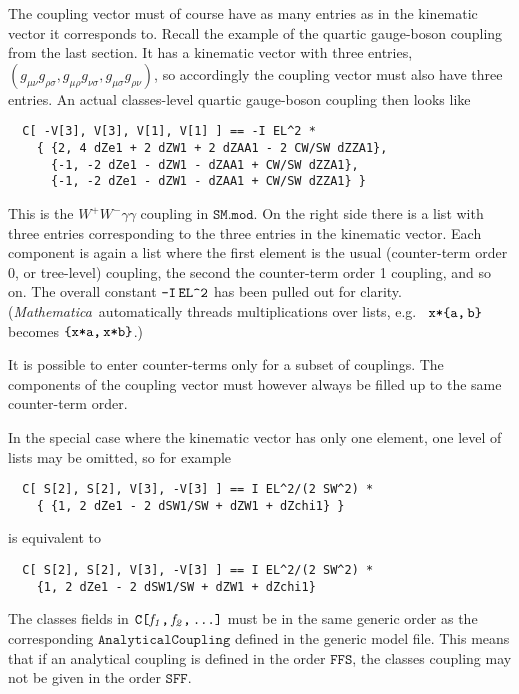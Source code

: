 \documentclass[twoside,12pt]{article}
\let\dots\textellipsis
\def\mma{{\it Mathematica}}
\def\eg{e.g.\ }
\def\lbrac{\symbol{123}}
\def\rbrac{\symbol{125}}
\def\Brac#1{\lbrac#1\rbrac}
\def\Code#1{\ensuremath{\texttt{#1}}}
\def\Var#1{\ensuremath{\mathit{#1}}}
\begin{document}
The coupling vector must of course have as many entries as in the
kinematic vector it corresponds to.  Recall the example of the quartic
gauge-boson coupling from the last section.  It has a kinematic vector 
with three entries, $(g_{\mu\nu} g_{\rho\sigma}, g_{\mu\rho} 
g_{\nu\sigma}, g_{\mu\sigma} g_{\rho\nu})$, so accordingly the coupling 
vector must also have three entries.  An actual classes-level quartic 
gauge-boson coupling then looks like%
%
%
%
%
\begin{verbatim}
  C[ -V[3], V[3], V[1], V[1] ] == -I EL^2 *
    { {2, 4 dZe1 + 2 dZW1 + 2 dZAA1 - 2 CW/SW dZZA1},
      {-1, -2 dZe1 - dZW1 - dZAA1 + CW/SW dZZA1},
      {-1, -2 dZe1 - dZW1 - dZAA1 + CW/SW dZZA1} }
\end{verbatim}
This is the $W^+W^-\gamma\gamma$ coupling in \Code{SM.mod}.  On the
right side there is a list with three entries corresponding to the three
entries in the kinematic vector.  Each component is again a list where
the first element is the usual (counter-term order 0, or tree-level)
coupling, the second the counter-term order 1 coupling, and so on.  The
overall constant \Code{-I\,EL\symbol{94}2} has been pulled out for
clarity.  (\mma\ automatically threads multiplications over lists, \eg
\Code{x*\Brac{a,\,b}} becomes \Code{\Brac{x*a,\,x*b}}.)

%
It is possible to enter counter-terms only for a subset of couplings.
The components of the coupling vector must however always be filled up to
the same counter-term order.

In the special case where the kinematic vector has only one element, one
level of lists may be omitted, so for example
\begin{verbatim}
  C[ S[2], S[2], V[3], -V[3] ] == I EL^2/(2 SW^2) *
    { {1, 2 dZe1 - 2 dSW1/SW + dZW1 + dZchi1} }
\end{verbatim}
is equivalent to
\begin{verbatim}
  C[ S[2], S[2], V[3], -V[3] ] == I EL^2/(2 SW^2) *
    {1, 2 dZe1 - 2 dSW1/SW + dZW1 + dZchi1}
\end{verbatim}

The classes fields in \Code{C[\Var{f_1},\,\Var{f_2},\,\dots]} must be in
the same generic order as the corresponding \Code{AnalyticalCoupling}
defined in the generic model file.  This means that if an analytical
coupling is defined in the order \Code{FFS}, the classes coupling may
not be given in the order \Code{SFF}.
\end{document}
